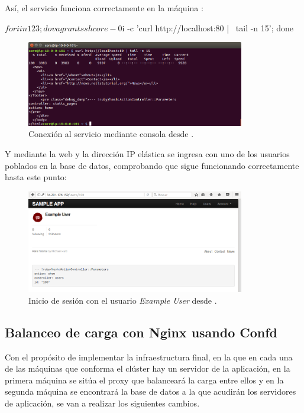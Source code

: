 Así, el servicio funciona correctamente en la máquina :
\begin{code}
$ for i in 1 2 3; do vagrant ssh core-0$i -c 'curl http://localhost:80 | \
  tail -n 15'; done
\end{code}

\begin{figure}[H]
\centering
\includegraphics[width=0.85\textwidth]{images/figures/skydns-curl.png}
\caption{Conexión al servicio mediante consola desde \kode{core-01}.}
\end{figure}

Y mediante la web y la dirección IP elástica se ingresa con uno de los usuarios poblados en la base de datos, comprobando que sigue funcionando correctamente hasta este punto:

\begin{figure}[H]
\centering
\includegraphics[width=0.85\textwidth]{images/figures/skydns-web.png}
\caption{Inicio de sesión con el usuario \textit{Example User} desde .}
\end{figure}

\subsection{Balanceo de carga con Nginx usando Confd}

Con el propósito de implementar la infraestructura final, en la que en cada una de las máquinas que conforma el clúster hay un servidor de la aplicación, en la primera máquina se sitúa el proxy que balanceará la carga entre ellos y en la segunda máquina se encontrará la base de datos a la que acudirán los servidores de aplicación, se van a realizar los siguientes cambios. 

